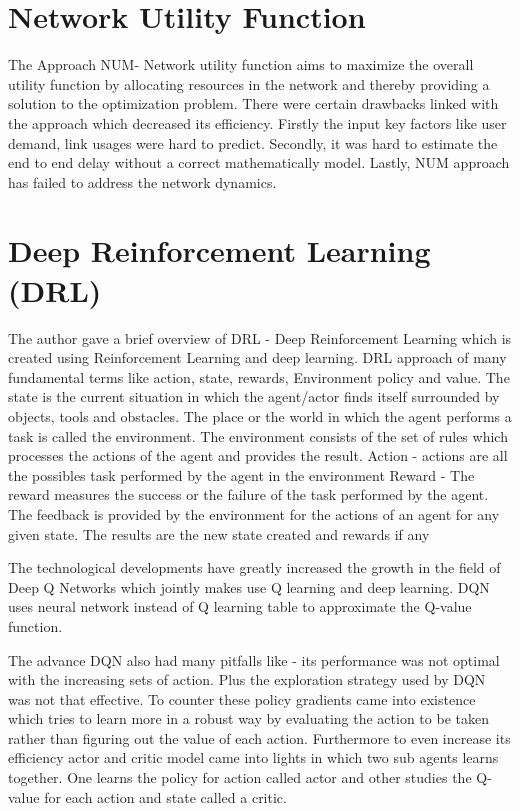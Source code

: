 \section{Network Utility Function}
\label{sec:NUM}

The Approach NUM- Network utility function \cite{low_Lapsley:_handb_Flowcontrol}  aims to maximize the overall utility function by allocating resources in the network and thereby providing a solution to the optimization problem. There were certain drawbacks linked with the approach which decreased its efficiency. Firstly the input key factors like user demand, link usages were hard to predict. Secondly, it was hard to estimate the end to end delay without a correct mathematically model. Lastly, NUM approach has failed to address the network dynamics.


\section{Deep Reinforcement Learning (DRL)}
\label{sec:relwork}
The author gave a brief overview of DRL - Deep Reinforcement Learning which is created using Reinforcement Learning and deep learning. 
DRL approach of many fundamental terms like action, state, rewards, Environment policy and value.
The state is the current situation in which the agent/actor finds itself surrounded by objects, tools and obstacles. 
The place or the world in which the agent performs a task is called the environment. The environment consists of the set of rules which processes the actions of the agent and provides the result.
Action - actions are all the possibles task performed by the agent in the environment
Reward - The reward measures the success or the failure of the task performed by the agent. The feedback is provided by the environment for the actions of an agent for any given state. The results are the new state created and rewards if any  

The technological developments have greatly increased the growth in the field of Deep Q Networks which jointly makes use Q learning and deep learning. DQN uses neural network instead of Q learning table to approximate the Q-value function.  

The advance DQN \cite{mnih2015humanlevel} also had many pitfalls like - its performance was not optimal with the increasing sets of action. Plus the exploration strategy used by DQN was not that effective. To counter these policy gradients came into existence which tries to learn more in a robust way by evaluating the action to be taken rather than figuring out the value of each action. Furthermore to even increase its efficiency actor and critic model came into lights in which two sub agents learns together. One learns the policy for action called actor and other studies the Q-value for each action and state called a critic.

